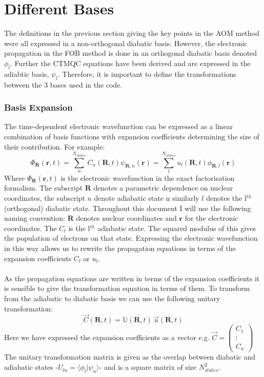 \section{Different Bases}
The definitions in the previous section giving the key points in the AOM method were all expressed in a non-orthogonal diabatic basis. However, the electronic propagation in the FOB method is done in an orthogonal diabatic basis denoted $\phi_{l}$. Further the CTMQC equations have been derived and are expressed in the adiabtic basis, $\psi_{l}$. Therefore, it is important to define the transformations between the 3 bases used in the code.
\subsubsection{Basis Expansion}
The time-dependent electronic wavefunction can be expressed as a linear combination of basis functions with expansion coefficients determining the size of their contribution. For example:
\begin{equation}
  \Phi_{\textbf{R}}(\textbf{r}, t) = \sum_{n}^{N_{states}}C_{n}(\textbf{R}, t) \psi_{\textbf{R}, n}(\textbf{r}) = \sum_{l}^{N_{states}} u_{l}(\textbf{R}, t) \phi_{\textbf{R}, l}(\textbf{r})
\end{equation}
Where $\Phi_{\textbf{R}}(\textbf{r}, t)$ is the electronic wavefunction in the exact factorisation formalism. The subscript $\textbf{R}$ denotes a parametric dependence on nuclear coordinates, the subscript $n$ denote adiabatic state n similarly $l$ denotes the l$^{th}$ (orthogonal) diabatic state. Throughout this document I will use the following naming convention: $\textbf{R}$ denotes nuclear coordinates and $\textbf{r}$ for the electronic coordinates. The $C_{l}$ is the l$^{th}$ adiabatic state. The squared modulus of this gives the population of electrons on that state. Expressing the electronic wavefunction in this way allows us to rewrite the propagation equations in terms of the expansion coefficients $C_{l}$ or $u_{l}$.
\\\\
As the propagation equations are written in terms of the expansion coefficients it is sensible to give the transformation equation in terms of them. To transform from the adiabatic to diabatic basis we can use the following unitary transformation:
\begin{equation}
  \vec{C}(\textbf{R}, t) = \mathbb{U}(\textbf{R}, t) \  \vec{u}(\textbf{R}, t)
  \label{eq:ad_to_di}
\end{equation}
Here we have expressed the expansion coefficients as a vector e.g. $\vec{C} = \left( \begin{array}{c}
C_1 \\
\vdots \\
C_n
\end{array}\right)$
The unitary transformation matrix is given as the overlap between diabatic and adiabatic states -$U_{ln} = \langle \phi_{l} | \psi_{n} \rangle$- and is a square matrix of size $N_{states} ^2$. 
